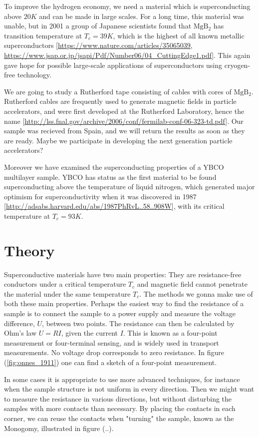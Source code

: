 \documentclass{comjnl}
\newcommand*\chem[1]{\ensuremath{\mathrm{#1}}}
\begin{document}
To improve the hydrogen economy, we need a material which is superconducting above $20K$ and can be made in large scales. For a long time, this material was unable, but in 2001 a group of Japanese scientists found that \chem{MgB_2} has transition temperature at $T_c=39K$, which is the highest of all known metallic superconductors [\url{https://www.nature.com/articles/35065039}, \url{https://www.jsap.or.jp/jsapi/Pdf/Number06/04_CuttingEdge1.pdf}]. This again gave hope for possible large-scale applications of superconductors using cryogen-free technology. 

We are going to study a Rutherford tape consisting of cables with cores of \chem{MgB_2}. Rutherford cables are frequently used to generate magnetic fields in particle accelerators, and were first developed at the Rutherford Laboratory, hence the name [\url{http://lss.fnal.gov/archive/2006/conf/fermilab-conf-06-323-td.pdf}]. Our sample was recieved from Spain, and we will return the results as soon as they are ready. Maybe we participate in developing the next generation particle accelerators?

Moreover we have examined the superconducting properties of a YBCO multilayer sample. YBCO has status as the first material to be found superconducting above the temperature of liquid nitrogen, which generated major optimism for superconductivity when it was discovered in 1987 [\url{http://adsabs.harvard.edu/abs/1987PhRvL..58..908W}], with its critical temperature at $T_c=93K$. 

\section{Theory}\label{Sec:Theory}
Superconductive materials have two main properties: They are resistance-free conductors under a critical temperature $T_c$ and magnetic field cannot penetrate the material under the same temperature $T_c$. The methods we gonna make use of both these main properties. Perhaps the easiest way to find the resistance of a sample is to connect the sample to a power supply and measure the voltage difference, $U$, between two points. The resistance can then be calculated by Ohm's law $U=RI$, given the current $I$. This is known as a four-point measurement or four-terminal sensing, and is widely used in transport measurements. No voltage drop corresponds to zero resistance. In figure (\ref{fig:onnes_1911}) one can find a sketch of a four-point measurement. 

In some cases it is appropriate to use more advanced techniques, for instance when the sample structure is not uniform in every direction. Then we might want to measure the resistance in various directions, but without disturbing the samples with more contacts than necessary. By placing the contacts in each corner, we can reuse the contacts when "turning" the sample, known as the Monogomy, illustrated in figure (..). 
\end{document}
